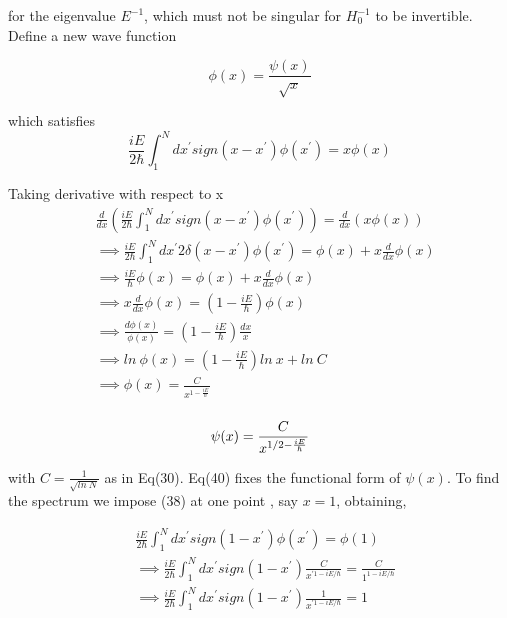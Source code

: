 \documentclass[12pt, letterpaper]{article}
\newcommand*{\1}{\hspace{1pt}}
\begin{document}
        for the eigenvalue $E^{-1}$, which must not be singular for $H_{0}^{-1}$ to be invertible. Define a new wave function 
    
        \begin{equation}
            \phi (x) = \frac{\psi (x)}{\sqrt{x}}
        \end{equation}

        which satisfies 
        \begin{equation}
            \frac{iE}{2\hbar} \int _{1}^{N} dx^{'}sign(x-x^{'})\phi(x^{'})= x\phi(x)
        \end{equation}

        Taking derivative with respect to x 
        \begin{equation}
            \begin{split}
                &\frac{d}{dx}\left(\frac{iE}{2\hbar} \int _{1}^{N} dx^{'}sign(x-x^{'})\phi(x^{'})\right)= \frac{d}{dx}\left( x\phi(x) \right) \\ 
                &\implies \frac{iE}{2\hbar} \int _{1}^{N} dx^{'}2\delta(x-x^{'})\phi(x^{'}) = \phi(x) + x \frac{d}{dx} \phi(x)  \\
                &\implies \frac{iE}{\hbar} \phi(x) = \phi(x) + x \frac{d}{dx} \phi(x)  \\
                &\implies x \frac{d}{dx} \phi(x) = \left(1 - \frac{iE}{\hbar}\right) \phi(x)   \\
                &\implies \frac{d\phi(x)}{\phi(x)} = \left(1 - \frac{iE}{\hbar}\right) \frac{dx}{x}   \\
                &\implies ln \ \phi(x) = \left(1 - \frac{iE}{\hbar}\right) ln \ x + ln \ C   \\
                &\implies \phi(x) = \frac{C}{x^{1 - \frac{iE}{\hbar}}}    \\
            \end{split}
        \end{equation}

        \begin{equation}
            \psi(x) = \frac{C}{x^{1/2 - \frac{iE}{\hbar}}}    \\
        \end{equation}

        with $C=\frac{1}{\sqrt{ln \  N}}$ as in Eq(30). Eq(40) fixes the functional form of $\psi(x)$. To find the spectrum we impose (38) at one point , say $x=1$, 
        obtaining,

        \begin{equation}
            \begin{split}
                &\frac{iE}{2\hbar} \int _{1}^{N} dx^{'} sign(1-x^{'}) \phi(x^{'}) = \phi(1) \\ 
                & \implies \frac{iE}{2\hbar} \int _{1}^{N} dx^{'} sign(1-x^{'}) \frac{C}{x^{' 1 - iE/\hbar}} = \frac{C}{1^{1 - iE/\hbar}} \\
                & \implies \frac{iE}{2\hbar} \int _{1}^{N} dx^{'} sign(1-x^{'}) \frac{1}{x^{' 1 - iE/\hbar}} = 1\\
            \end{split}
        \end{equation}
\end{document}
